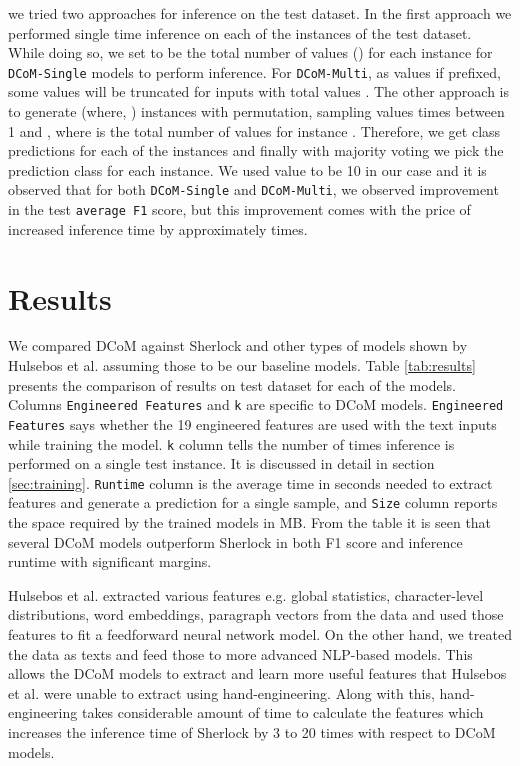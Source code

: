 \documentclass{article}
\begin{document}
we tried two approaches for inference on the test dataset. In the first approach we performed single time inference on each of the instances of the test dataset. While doing so, we set  to be the total number of values () for each instance for \texttt{DCoM-Single} models to perform inference. For \texttt{DCoM-Multi}, as  values if prefixed, some values will be truncated for inputs with total values . The other approach is to generate  (where, ) instances with permutation, sampling  values  times between 1 and , where  is the total number of values for instance . Therefore, we get  class predictions for each of the instances and finally with majority voting we pick the prediction class for each instance. We used  value to be 10 in our case and it is observed that for both \texttt{DCoM-Single} and \texttt{DCoM-Multi}, we observed  improvement in the test \texttt{average F1} score, but this improvement comes with the price of increased inference time by approximately  times. 

\section{Results}
\label{sec:results}

We compared DCoM against Sherlock and other types of models shown by Hulsebos et al. \cite{Hulsebos} assuming those to be our baseline models. Table \ref{tab:results} presents the comparison of results on test dataset for each of the models. Columns \texttt{Engineered Features} and \texttt{k} are specific to DCoM models. \texttt{Engineered Features} says whether the 19 engineered features are used with the text inputs while training the model. \texttt{k} column tells the number of times inference is performed on a single test instance. It is discussed in detail in section \ref{sec:training}. \texttt{Runtime} column is the average time in seconds needed to extract features and generate a prediction for a single sample, and \texttt{Size} column reports the space required by the trained models in MB. From the table it is seen that several DCoM models outperform Sherlock \cite{Hulsebos} in both F1 score and inference runtime with significant margins. 

Hulsebos et al. \cite{Hulsebos} extracted various features e.g. global statistics, character-level distributions, word embeddings, paragraph vectors from the data and used those features to fit a feedforward neural network model. On the other hand, we treated the data as texts and feed those to more advanced NLP-based models. This allows the DCoM models to extract and learn more useful features that Hulsebos et al. \cite{Hulsebos} were unable to extract using hand-engineering. Along with this, hand-engineering takes considerable amount of time to calculate the features which increases the inference time of Sherlock \cite{Hulsebos} by 3 to 20 times with respect to DCoM models.
\end{document}

